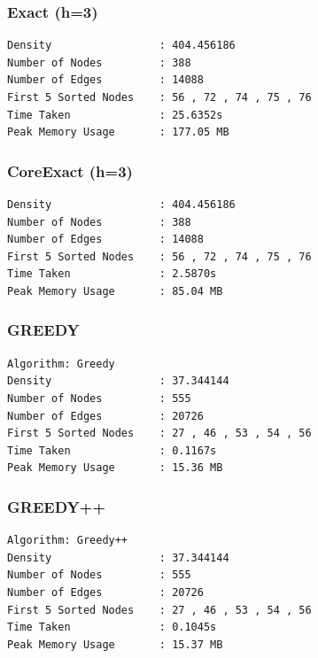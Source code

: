 \documentclass[12pt,a4paper]{article}
\begin{document}
\subsubsection*{Exact (h=3)}
\begin{verbatim}
Density                 : 404.456186
Number of Nodes         : 388
Number of Edges         : 14088
First 5 Sorted Nodes    : 56 , 72 , 74 , 75 , 76
Time Taken              : 25.6352s
Peak Memory Usage       : 177.05 MB
\end{verbatim}

\subsubsection*{CoreExact (h=3)}
\begin{verbatim}
Density                 : 404.456186
Number of Nodes         : 388
Number of Edges         : 14088
First 5 Sorted Nodes    : 56 , 72 , 74 , 75 , 76
Time Taken              : 2.5870s
Peak Memory Usage       : 85.04 MB
\end{verbatim}

\subsubsection*{GREEDY}
\begin{verbatim}
Algorithm: Greedy
Density                 : 37.344144
Number of Nodes         : 555
Number of Edges         : 20726
First 5 Sorted Nodes    : 27 , 46 , 53 , 54 , 56 
Time Taken              : 0.1167s
Peak Memory Usage       : 15.36 MB
\end{verbatim}

\subsubsection*{GREEDY++}
\begin{verbatim}
Algorithm: Greedy++
Density                 : 37.344144
Number of Nodes         : 555
Number of Edges         : 20726
First 5 Sorted Nodes    : 27 , 46 , 53 , 54 , 56 
Time Taken              : 0.1045s
Peak Memory Usage       : 15.37 MB
\end{verbatim}
\end{document}
